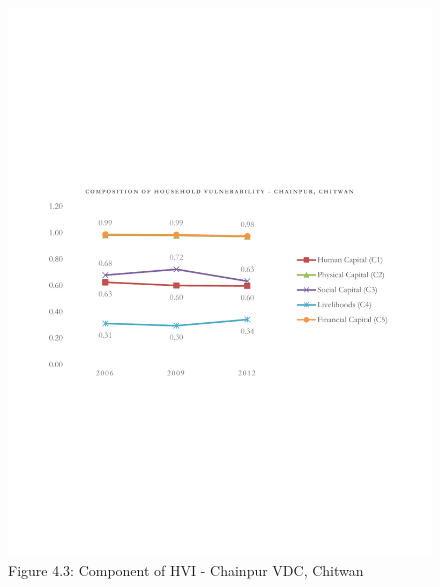 \documentclass[12pt, a4paper]{article}
\begin{document}
\begin{center}
\begin{figure}[H]
	\vspace{-140pt}
	\includegraphics[scale=0.7]{HVI_Component_Chainpur1.pdf}
	\captionsetup{labelformat=empty, belowskip=0.01pt}
	\vspace{-160pt}
	\caption{Figure 4.3: Component of HVI - Chainpur VDC, Chitwan}
	\setlength{\abovecaptionskip}{6pt}
	\setlength{\belowcaptionskip}{3pt}
	\label{fig:hvichainpurComponent}
\end{figure}
\end{center}
\vspace{-25pt}
\end{document}

